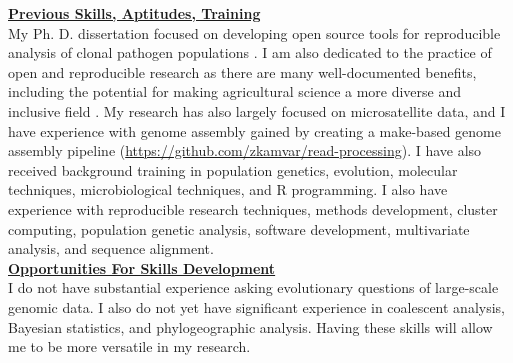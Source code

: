 \documentclass[12pt,letterpaper]{article}
\begin{document}
\noindent \textbf{\underline{Previous Skills, Aptitudes, Training}}\\

My Ph. D. dissertation focused on developing open source tools for reproducible analysis of clonal pathogen populations \citep{kamvar2014poppr}. 
I am also dedicated to the practice of open and reproducible research as there are many well-documented benefits, including the potential for making agricultural science a more diverse and inclusive field \citep{whitaker2017publishing,boettiger2015introduction}. 
My research has also largely focused on microsatellite data, and I have experience with genome assembly gained by creating a make-based genome assembly pipeline (\url{https://github.com/zkamvar/read-processing}). 
I have also received background training in population genetics, evolution, molecular techniques, microbiological techniques, and R programming. 
I also have experience with reproducible research techniques, methods development, cluster computing, population genetic analysis, software development, multivariate analysis, and sequence alignment. \\

\noindent \textbf{\underline{Opportunities For Skills Development}}\\
I do not have substantial experience asking evolutionary questions of large-scale genomic data. 
I also do not yet have significant experience in coalescent analysis, Bayesian statistics, and phylogeographic analysis.
Having these skills will allow me to be more versatile in my research.\\



\end{document}
